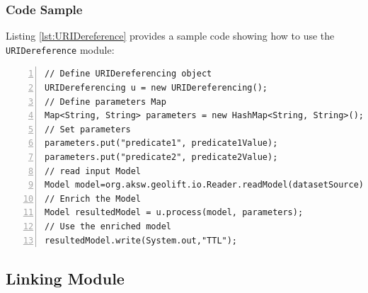 \documentclass[a4paper,twoside,bibtotoc,abstracton,12pt,BCOR=15mm]{article}
\begin{document}
\subsubsection{Code Sample}
Listing \ref{lst:URIDereference} provides a sample code showing how to use the \texttt{URIDereference} module:

\begin{lstlisting}[label=lst:URIDereference, numbers=left, numberstyle=\tiny, caption = Code fragment to call the \texttt{URIDereferencing} class.]
// Define URIDereferencing object
URIDereferencing u = new URIDereferencing();
// Define parameters Map
Map<String, String> parameters = new HashMap<String, String>();
// Set parameters
parameters.put("predicate1", predicate1Value);
parameters.put("predicate2", predicate2Value);
// read input Model
Model model=org.aksw.geolift.io.Reader.readModel(datasetSource);
// Enrich the Model
Model resultedModel = u.process(model, parameters);
// Use the enriched model
resultedModel.write(System.out,"TTL");
\end{lstlisting}


\subsection{Linking Module}
\end{document}
